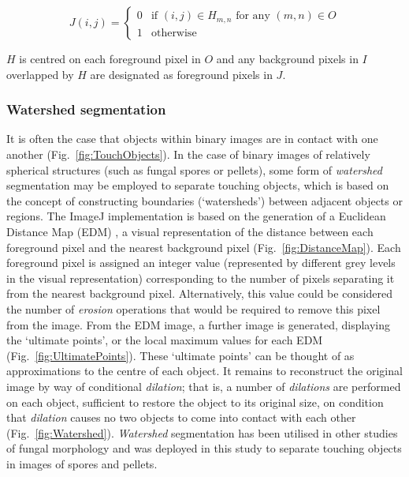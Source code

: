 \begin{equation}
	J(i,j) = \begin{cases} 0 & \mbox{if } (i,j) \in H_{m,n} \mbox{ for any } (m,n) \in O\\
																			1 & \mbox{otherwise}
												\end{cases}
\end{equation}

\noindent $H$ is centred on each foreground pixel in $O$ and any background pixels in $I$ overlapped by $H$ are designated as foreground pixels in $J$.

\subsubsection{Watershed segmentation}

It is often the case that objects within binary images are in contact with one another (Fig.~\ref{fig:TouchObjects}). In the case of binary images of relatively spherical structures (such as fungal spores or pellets), some form of \emph{watershed} segmentation may be employed to separate touching objects, which is based on the concept of constructing boundaries (\lq watersheds') between adjacent objects or regions. The ImageJ implementation is based on the generation of a Euclidean Distance Map (EDM) \cite{leymarie1992}, a visual representation of the distance between each foreground pixel and the nearest background pixel (Fig.~\ref{fig:DistanceMap}). Each foreground pixel is assigned an integer value (represented by different grey levels in the visual representation) corresponding to the number of pixels separating it from the nearest background pixel. Alternatively, this value could be considered the number of \emph{erosion} operations that would be required to remove this pixel from the image. From the EDM image, a further image is generated, displaying the \lq ultimate points', or the local maximum values for each EDM (Fig.~\ref{fig:UltimatePoints}). These \lq ultimate points' can be thought of as approximations to the centre of each object. It remains to reconstruct the original image by way of conditional \emph{dilation}; that is, a number of \emph{dilations} are performed on each object, sufficient to restore the object to its original size, on condition that \emph{dilation} causes no two objects to come into contact with each other (Fig.~\ref{fig:Watershed}). \emph{Watershed} segmentation has been utilised in other studies of fungal morphology \cite{ocleirigh2003,bizukojc2009} and was deployed in this study to separate touching objects in images of spores and pellets.

